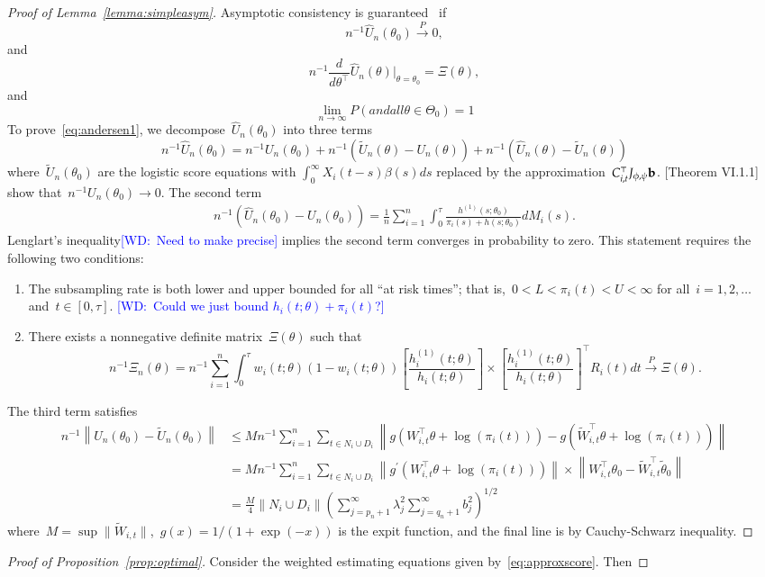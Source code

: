 \documentclass[11pt]{amsart}
\newcommand{\walt}[1]{\textcolor{blue}{[WD:\ #1]}}
\begin{document}
\begin{proof}[Proof of Lemma~\ref{lemma:simpleasym}]
Asymptotic consistency is guaranteed~\cite[Theorem VI.1.1]{Andersen1993} if
\begin{equation}
\label{eq:andersen1}
n^{-1} \hat U_n (\theta_0 ) \overset{P}{\to} 0,
\end{equation}
and 
\[
n^{-1} \frac{d}{d \theta^{\top}} \hat U_n (\theta) \big |_{\theta =
  \theta_0} = \Xi (\theta),
\]
and
\[
\lim_{n \to \infty} P \left(  and all \theta \in \Theta_0 \right) = 1
\]
To prove~\eqref{eq:andersen1}, we decompose~$\hat U_n (\theta_0)$ into
three terms
\[
n^{-1} \hat U_n (\theta_0) = n^{-1} U_n (\theta_0 )  + n^{-1} \left(
  \tilde U_n (\theta) - U_n (\theta) \right) + n^{-1} \left(\hat U_n
  (\theta) - \tilde U_n (\theta) \right)
\]
where~$\tilde U_n (\theta_0)$ are the logistic score equations with
$\int_0^\infty X_i(t-s) \beta(s) ds$ replaced by the
approximation~$C_{i,t}^\top J_{\phi, \psi} {\bf b}$. 
\cite{Andersen1993}[Theorem VI.1.1] show that~$n^{-1} U_n (\theta_0)
\to 0$. The second term
\begin{align*}
n^{-1} \left( \hat U_n (\theta_0) - U_n (\theta_0) \right) =
  \frac{1}{n} \sum_{i=1}^n \int_0^{\tau} \frac{h^{(1)} (s;
  \theta_0)}{\pi_i (s) + h (s;\theta_0)} d M_i (s). 
\end{align*}
Lenglart's inequality\walt{Need to make precise} implies
the second term converges in probability to zero.  This statement
requires the following two conditions:
\begin{enumerate}
\item The subsampling rate is both lower and upper bounded for all
  ``at risk times''; that is,~$0 < L < \pi_i (t) < U < \infty$ for
  all~$i=1,2,\ldots$ and~$t \in [0,\tau]$. \walt{Could we just bound
    $h_i (t; \theta) + \pi_i (t)$?}
\item There exists a nonnegative definite matrix~$\Xi (\theta)$ such that
\[
n^{-1} \Xi_n (\theta) = n^{-1} \sum_{i=1}^n \int_0^\tau w_i (t;
\theta) (1 - w_i (t; \theta)) \left[ \frac{h_i^{(1)}(t;
      \theta)}{h_i (t; \theta)} \right] \times  \left [
    \frac{h_i^{(1)} (t;\theta)}{h_i(t; \theta)} \right]^\top R_i (t)
  dt \overset{P}{\to} \Xi (\theta).
\] 
\end{enumerate}
The third term satisfies
\begin{align*}
n^{-1} \left \| \hat U_n (\theta_0) - \tilde U_n (\theta_0) \right \|
  &\leq M n^{-1} \sum_{i=1}^n \sum_{t \in N_i \cup D_i}
    \left \| g \left( W_{i,t}^\top \theta + \log (\pi_i (t)
  ) \right) - g \left( \tilde W_{i,t}^\top \theta + \log (\pi_i (t) 
  ) \right) \right \| \\
&= M n^{-1} \sum_{i=1}^n \sum_{t \in N_i \cup D_i}
    \left \| g^\prime \left( W_{i,t}^\top \theta + \log (\pi_i (t) )
  \right) \right\| \times \left \| W_{i,t}^\top \theta_0 - \tilde W_{i,t}^\top
  \tilde \theta_0  \right \| \\
&= \frac{M}{4} \| N_i \cup D_i \| \left ( \sum_{j=p_n+1}^\infty
  \lambda_{j}^2 \sum_{j=q_n+1}^\infty b_j^2 \right)^{1/2}
\end{align*}
where~$M = \sup \| \tilde W_{i,t} \|$,~$g(x) = 1/(1+\exp(-x))$ is the
expit function, and the final line is by Cauchy-Schwarz inequality.


\end{proof}

\begin{proof}[Proof of Proposition~\ref{prop:optimal}]
Consider the weighted estimating equations given by~\eqref{eq:approxscore}.
Then
\end{proof}
\end{document}
